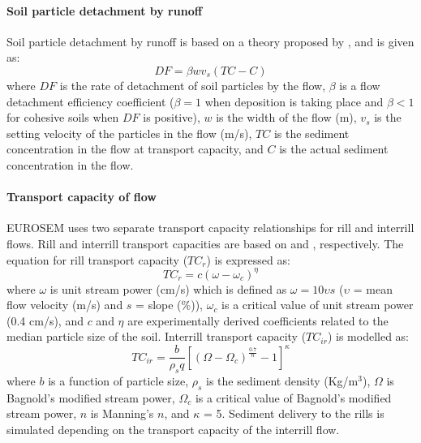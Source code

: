 \paragraph{Soil particle detachment by runoff}
\label{sec:SoilParticleDetachmentByRunoff}
Soil particle detachment by runoff is based on a theory proposed by
\citet{smith1995-517}, and is given as:
\begin{equation}
\label{eq:eurosemsoilparticledetachmentbyrunoff}
  DF = \beta w v_s (TC-C)
\end{equation}
where $DF$ is the rate of detachment of soil particles by the flow, $\beta$ is a
flow detachment efficiency coefficient ($\beta=1$ when deposition is taking
place and $\beta < 1$ for cohesive soils when $DF$ is positive), $w$ is the
width of the flow (m), $v_s$ is the setting velocity of the particles in the
flow (m/s), $TC$ is the sediment concentration in the flow at transport
capacity, and $C$ is the actual sediment concentration in the flow.

\paragraph{Transport capacity of flow}
\label{sec:TransportCapacityOfTheFlow}
EUROSEM uses two separate transport capacity relationships for rill and
interrill flows. Rill and interrill transport capacities are based on
\citet{govers1990-45} and \citet{everaert1991-513}, respectively. The equation
for rill transport capacity ($TC_{r}$) is expressed as:
\begin{equation}
\label{eq:EUROSEMRillTransportCapacity}
  TC_{r} = c(\omega - \omega_c)^{\eta}
\end{equation}
where $\omega$ is unit stream power (cm/s) which is defined as $\omega = 10
\upsilon s$ ($\upsilon$ = mean flow velocity (m/s) and $s$ = slope (\%)),
$\omega_c$ is a critical value of unit stream power (0.4 cm/s), and $c$ and
$\eta$ are experimentally derived coefficients related to the median particle
size of the soil.
Interrill transport capacity ($TC_{ir}$) is modelled as:
\begin{equation}
\label{eq:EUROSEMInterrillTransportCapacity}
  TC_{ir} = \frac{b}{\rho_s q}\left[(\Omega -
\Omega_c)^{\frac{0.7}{n}}-1\right]^{\kappa}
\end{equation}
where $b$ is a function of particle size, $\rho_s$ is the sediment density
(Kg/m$^3$), $\Omega$ is Bagnold's modified stream power, $\Omega_c$ is a
critical value of Bagnold's modified stream power, $n$ is Manning's $n$, and
$\kappa$ = 5. Sediment delivery to the rills is simulated depending on the
transport capacity of the interrill flow.

